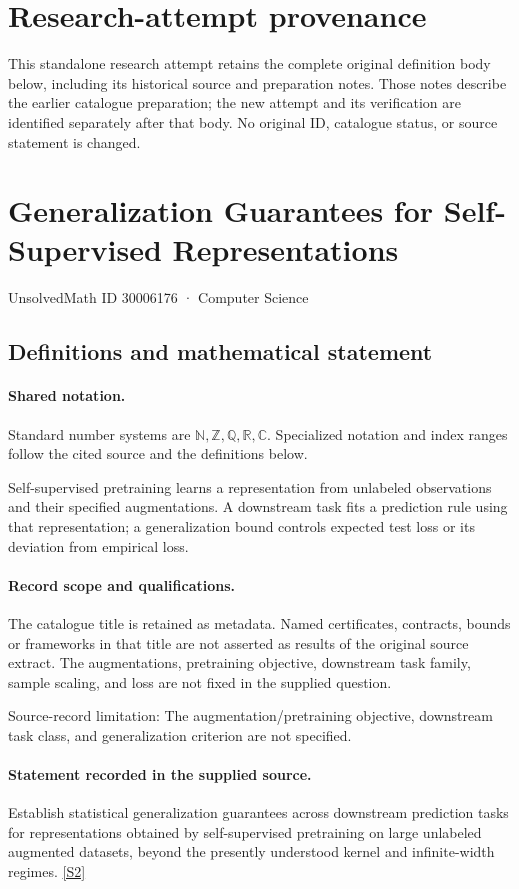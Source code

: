 \documentclass[11pt]{article}
\begin{document}
\section*{Research-attempt provenance}
This standalone research attempt retains the complete original definition body below,
including its historical source and preparation notes. Those notes describe the
earlier catalogue preparation; the new attempt and its verification are identified
separately after that body. No original ID, catalogue status, or source statement is changed.

\section{Generalization Guarantees for Self-Supervised Representations}\label{30006176}
{\small UnsolvedMath ID 30006176 · Computer Science}
\subsection{Definitions and mathematical statement}

\paragraph{Shared notation.}Standard number systems are $\mathbb N,\mathbb Z,\mathbb Q,\mathbb R,\mathbb C$. Specialized notation and index ranges follow the cited source and the definitions below.


Self-supervised pretraining learns a representation from unlabeled observations and their specified augmentations. A downstream task fits a prediction rule using that representation; a generalization bound controls expected test loss or its deviation from empirical loss.
\paragraph{Record scope and qualifications.}
The catalogue title is retained as metadata. Named certificates, contracts, bounds or frameworks in that title are not asserted as results of the original source extract.
The augmentations, pretraining objective, downstream task family, sample scaling, and loss are not fixed in the supplied question.

Source-record limitation: The augmentation/pretraining objective, downstream task class, and generalization criterion are not specified.
\paragraph{Statement recorded in the supplied source.}
Establish statistical generalization guarantees across downstream prediction tasks for representations obtained by self-supervised pretraining on large unlabeled augmented datasets, beyond the presently understood kernel and infinite-width regimes. \href{https://doi.org/10.4171/owr/2025/4}{[S2]}
\end{document}
